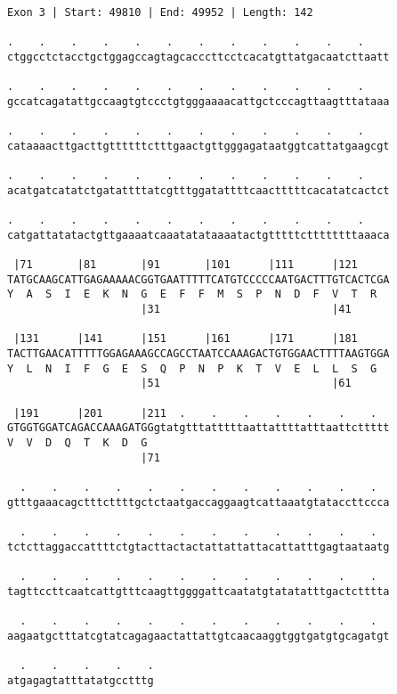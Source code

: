\documentclass{article}
\begin{document}
\begin{Verbatim}
Exon 3 | Start: 49810 | End: 49952 | Length: 142
 
.    .    .    .    .    .    .    .    .    .    .    .    
ctggcctctacctgctggagccagtagcacccttcctcacatgttatgacaatcttaatt
  
.    .    .    .    .    .    .    .    .    .    .    .    
gccatcagatattgccaagtgtccctgtgggaaaacattgctcccagttaagtttataaa
  
.    .    .    .    .    .    .    .    .    .    .    .    
cataaaacttgacttgttttttctttgaactgttgggagataatggtcattatgaagcgt
  
.    .    .    .    .    .    .    .    .    .    .    .    
acatgatcatatctgatattttatcgtttggatattttcaactttttcacatatcactct
  
.    .    .    .    .    .    .    .    .    .    .    .    
catgattatatactgttgaaaatcaaatatataaaatactgtttttcttttttttaaaca
  
 |71       |81       |91       |101      |111      |121     
TATGCAAGCATTGAGAAAAACGGTGAATTTTTCATGTCCCCCAATGACTTTGTCACTCGA
Y  A  S  I  E  K  N  G  E  F  F  M  S  P  N  D  F  V  T  R  
                     |31                           |41      
  
 |131      |141      |151      |161      |171      |181     
TACTTGAACATTTTTGGAGAAAGCCAGCCTAATCCAAAGACTGTGGAACTTTTAAGTGGA
Y  L  N  I  F  G  E  S  Q  P  N  P  K  T  V  E  L  L  S  G  
                     |51                           |61      
  
 |191      |201      |211  .    .    .    .    .    .    .  
GTGGTGGATCAGACCAAAGATGGgtatgtttatttttaattattttatttaattcttttt
V  V  D  Q  T  K  D  G                                      
                     |71                                    
  
  .    .    .    .    .    .    .    .    .    .    .    .  
gtttgaaacagctttcttttgctctaatgaccaggaagtcattaaatgtataccttccca
  
  .    .    .    .    .    .    .    .    .    .    .    .  
tctcttaggaccattttctgtacttactactattattattacattatttgagtaataatg
  
  .    .    .    .    .    .    .    .    .    .    .    .  
tagttccttcaatcattgtttcaagttggggattcaatatgtatatatttgactctttta
  
  .    .    .    .    .    .    .    .    .    .    .    .  
aagaatgctttatcgtatcagagaactattattgtcaacaaggtggtgatgtgcagatgt
  
  .    .    .    .    .
atgagagtatttatatgcctttg
\end{Verbatim}
\newpage
\end{document}
